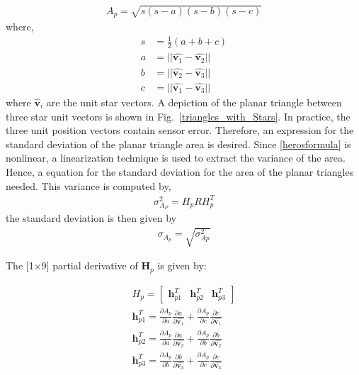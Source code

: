 \documentclass[]{aiaa-tc}%
\begin{document}
\begin{align}
\label{herosformula}
A_p = \sqrt{s(s-a)(s-b)(s-c)}
\end{align}
where, 
\vspace{-1 cm}
\begin{subequations}
\begin{align}
s &= \frac{1}{2}(a+b+c)\\
a &= ||\hat{\textbf{v}_1} - \hat{\textbf{v}_2}||\\
b &= ||\hat{\textbf{v}_2} - \hat{\textbf{v}_3}||\\
c &= ||\hat{\textbf{v}_1} - \hat{\textbf{v}_3}||
\end{align}
\end{subequations}
where $\hat{\textbf{v}}_i$ are the unit star vectors. A depiction of the planar triangle between three star unit vectors is shown in Fig.~\ref{triangles_with_Stars}. In practice,
the three unit position vectors contain sensor error. Therefore, an expression for the standard
deviation of the planar triangle area is desired. Since \cref{herosformula} is nonlinear, a linearization
technique is used to extract the variance of the area. Hence, a equation for the standard deviation for the area of the planar triangles needed. This variance is computed by,
\begin{align}
\sigma^2_{A_{P}} = H_p R H^{T}_p \label{area_covar}
\end{align}
the standard deviation is then given by
\begin{align}
\sigma_{A_{p}} = \sqrt{\sigma^2_{A{p}}} \label{area_STD}
\end{align}

The [1$\times$9] partial derivative of $\textbf{H}_p$ is given by:

\begin{subequations}
\begin{align}
H_p =
\begin{bmatrix}
\textbf{h}_{p1}^{T} & \textbf{h}_{p2}^{T} & \textbf{h}_{p3}^{T}
\end{bmatrix} \\
\textbf{h}_{p1}^{T} = \frac{\partial A_p}{\partial a}\frac{\partial a}{\partial \hat{\textbf{v}_1}} + \frac{\partial A_p}{\partial c}\frac{\partial c}{\partial \hat{\textbf{v}_1}}\\
\textbf{h}_{p2}^{T} = \frac{\partial A_p}{\partial a}\frac{\partial a}{\partial \hat{\textbf{v}_2}} + \frac{\partial A_p}{\partial b}\frac{\partial b}{\partial \hat{\textbf{v}_2}}\\
\textbf{h}_{p3}^{T} = \frac{\partial A_p}{\partial b}\frac{\partial b}{\partial \hat{\textbf{v}_3}} + \frac{\partial A_p}{\partial c}\frac{\partial c}{\partial \hat{\textbf{v}_3}}\\
\end{align}
\end{subequations}
\end{document}
